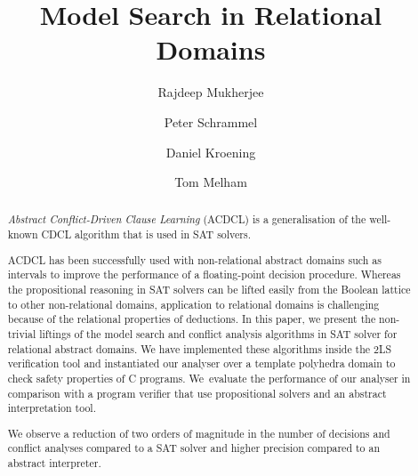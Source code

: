 \documentclass[a4paper]{llncs}
\newcommand{\Omit}[1]{}
\begin{document}
\title{Model Search in Relational Domains}

\author{Rajdeep Mukherjee \and Peter Schrammel \and
Daniel Kroening \and Tom Melham}


\maketitle

\begin{abstract}
%
\emph{Abstract Conflict-Driven Clause Learning} (ACDCL) is a generalisation
of the well-known CDCL algorithm that is used in SAT solvers.
%
\Omit {  ACDCL alternates between a model search, which
performs over-approximate deduction with constraint propagation, and a
conflict analysis, which performs under-approximate abduction with heuristic
choice.
}
%
ACDCL has been successfully used with non-relational abstract domains such
as intervals to improve the performance of a floating-point decision
procedure.  Whereas the propositional reasoning in SAT 
solvers can be lifted easily from the Boolean lattice to other 
non-relational domains, application to relational domains is 
challenging because of the relational properties of deductions.
%
In this paper, we present the non-trivial liftings of the model search and
conflict analysis algorithms in SAT solver for relational abstract domains.  We have
implemented these algorithms inside the 2LS verification tool and
instantiated our analyser over a template polyhedra domain to check safety
properties of C programs.  We~evaluate the performance of our analyser in
comparison with a program verifier that use propositional solvers and
an abstract interpretation tool.
%
\Omit {
on a set of benchmarks drawn from bit-vector regression 
in SV-COMP'16, bit-precise software models of hardware 
circuits auto-generated from v2c tool, and several 
bounds checking benchmarks 
}
We observe a reduction of two orders of magnitude in the number of 
decisions and conflict analyses compared to a SAT 
solver and higher precision compared to an abstract interpreter. 
\Omit{
along with stronger deductions and learnt clauses aided by the richer
abstract domains.
}
%
\end{abstract}
\end{document}
